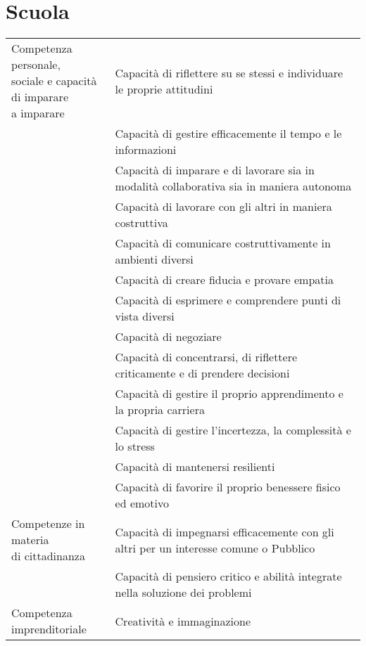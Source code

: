 \chapter{Scuola}
\begin{adjustbox}{max width=\textwidth}
\begin{tabular}{m{4cm}p{12.0cm}}
\toprule
\multirowcell{14}{Competenza personale,\\sociale e capacità\\ di imparare\\ a imparare}& Capacità di riflettere su se stessi e individuare le proprie attitudini\\
	&Capacità di gestire efficacemente il tempo e le informazioni  \\
	& Capacità di imparare e di lavorare sia in modalità collaborativa sia in maniera
	autonoma\\
	&  Capacità di lavorare con gli altri in maniera costruttiva\\
	&  Capacità di comunicare costruttivamente in ambienti diversi\\
	&  Capacità di creare fiducia e provare empatia\\
	&  Capacità di esprimere e comprendere punti di vista diversi\\
	&  Capacità di negoziare\\
	&  Capacità di concentrarsi, di riflettere criticamente e di prendere decisioni\\
	&  Capacità di gestire il proprio apprendimento e la propria carriera\\
	&  Capacità di gestire l'incertezza, la complessità e lo stress\\
	&  Capacità di mantenersi resilienti\\
	&  Capacità di favorire il proprio benessere fisico ed emotivo\\
\midrule
\multirowcell{1}{Competenze in materia\\di cittadinanza
}	& Capacità di impegnarsi efficacemente con gli altri per un interesse comune o
Pubblico \\
	& Capacità di pensiero critico e abilità integrate nella soluzione dei problemi \\
\midrule
	\multirowcell{12}{Competenza\\imprenditoriale}& Creatività e immaginazione\\

\end{tabular}
\end{adjustbox}

